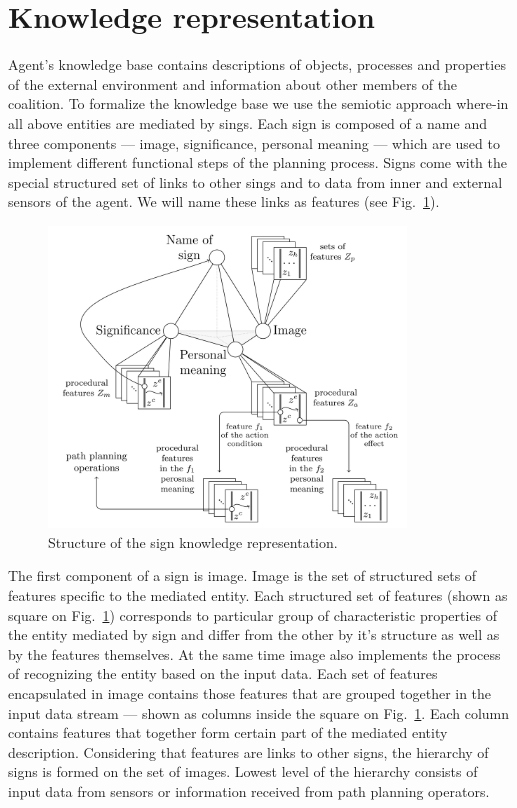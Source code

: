 \documentclass[runningheads,a4paper]{llncs}
\begin{document}
\section{Knowledge representation}\label{knowledge}

Agent's knowledge base contains descriptions of objects, processes and properties of the external environment and information about other members of the coalition. To formalize the knowledge base we use the semiotic approach where-in all above entities are mediated by sings.  Each sign is composed of a name and three components --- image, significance, personal meaning --- which are used to implement different functional steps of the planning process. Signs come with the special structured set of links to other sings and to data from inner and external sensors of the agent. We will name these links as features (see Fig.~\ref{fig:sign}).

\begin{figure}
	\centering
	\includegraphics[height=8cm]{sign_kr}
	\caption{Structure of the sign knowledge representation.}
	\label{fig:sign}
\end{figure}

The first component of a sign is image. Image is the set of structured sets of features specific to the mediated entity. Each structured set of features (shown as square on Fig.~\ref{fig:sign}) corresponds to particular group of characteristic properties of the entity mediated by sign and differ from the other by it's structure as well as by the features themselves. At the same time image also implements the process of recognizing the entity based on the input data. Each set of features encapsulated in image contains those features that are grouped together in the input data stream --- shown as columns inside the square on Fig.~\ref{fig:sign}. Each column contains features that together form certain part of the mediated entity description. Considering that features are links to other signs, the hierarchy of signs is formed on the set of images. Lowest level of the hierarchy consists of input data from sensors or information received from path planning operators.
\end{document}
